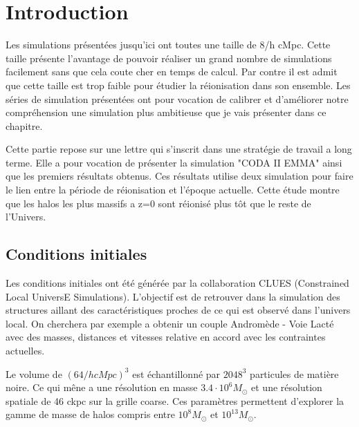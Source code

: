 \section{Introduction}
\label{sec:CODAEMMA}

Les simulations présentées jusqu'ici ont toutes une taille de 8/h cMpc.
Cette taille présente l'avantage de pouvoir réaliser un grand nombre de simulations facilement sans que cela coute cher en temps de calcul.
Par contre il est admit que cette taille est trop faible pour étudier la réionisation dans son ensemble.
Les séries de simulation présentées ont pour vocation de calibrer et d'améliorer notre compréhension une simulation plus ambitieuse que je vais présenter dans ce chapitre.




Cette partie repose sur une lettre qui s'inscrit dans une stratégie de travail a long terme.
Elle a pour vocation de présenter la simulation "CODA II EMMA" ainsi que les premiers résultats obtenus.
Ces résultats utilise deux simulation pour faire le lien entre la période de réionisation et l’époque actuelle.
Cette étude montre que les halos les plus massifs a z=0 sont réionisé plus tôt que le reste de l'Univers.



\subsection{Conditions initiales}

Les conditions initiales ont été générée par la collaboration CLUES (Constrained Local UniversE Simulations).
L'objectif est de retrouver dans la simulation des structures aillant des caractéristiques proches de ce qui est observé dans l'univers local.
On cherchera par exemple a obtenir un couple Andromède - Voie Lacté avec des masses, distances et vitesses relative en accord avec les contraintes actuelles.


Le volume de $\left( 64/h cMpc \right) ^3$ est échantillonné par $2048^3$ particules de matière noire.
Ce qui mêne a une résolution en masse $3.4 \cdot 10^6 M_\odot$ et une résolution spatiale de 46 ckpc sur la grille coarse.
Ces paramètres permettent d'explorer la gamme de masse de halos compris entre $10^8 M_\odot$ et  $10^{13}M_\odot$.

